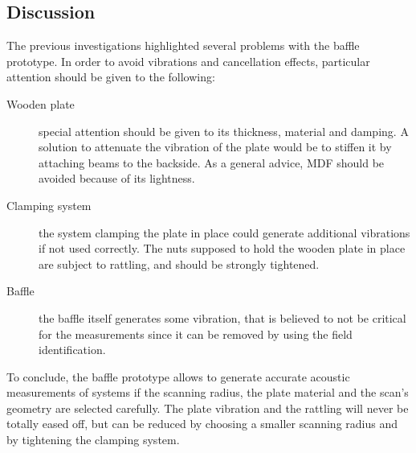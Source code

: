 \documentclass{report}
\begin{document}
\subsection{Discussion}

The previous investigations highlighted several problems with the baffle prototype. In order to avoid vibrations and cancellation effects, particular attention should be given to the following:
\begin{description}
\item[Wooden plate] special attention should be given to its thickness, material and damping. A solution to attenuate the vibration of the plate would be to stiffen it by attaching beams to the backside. As a general advice, MDF should be avoided because of its lightness. 
\item[Clamping system] the system clamping the plate in place could generate additional vibrations if not used correctly. The nuts supposed to hold the wooden plate in place are subject to rattling, and should be strongly tightened.
\item[Baffle] the baffle itself generates some vibration, that is believed to not be critical for the measurements since it can be removed by using the field identification. 
\end{description}

To conclude, the baffle prototype allows to generate accurate acoustic measurements of systems if the scanning radius, the plate material and the scan's geometry are selected carefully. The plate vibration and the rattling will never be totally eased off, but can be reduced by choosing a smaller scanning radius and by tightening the clamping system. \\
\end{document}

